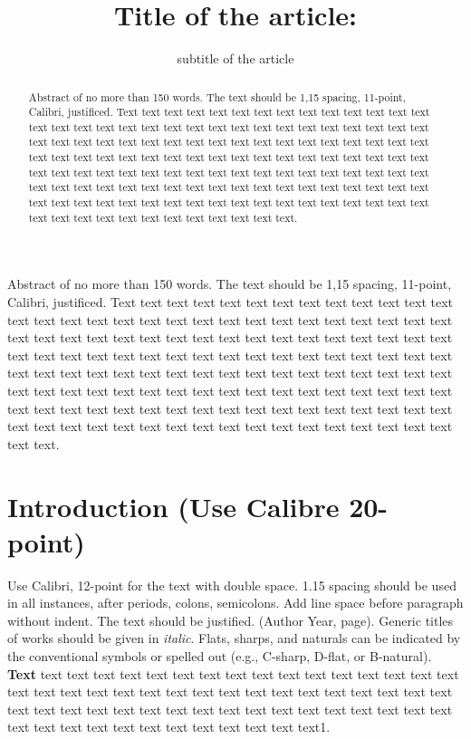 \documentclass{permusi}
\title{Title of the article:}
\subtitle{subtitle of the article}
\begin{document}
\begin{abstract}
 Abstract of no more than 150 words. The text should be 1,15 spacing, 11-point, Calibri, justificed. Text text
text text text text text text text text text text text text text text text text text text text text text text text text text text
text text text text text text text text text text text text text text text text text text text text text text text text text text
text text text text text text text text text text text text text text text text text text text text text text text text text text
text text text text text text text text text text text text text text text text text text text text text text text text text text
text text text text text text text text text text text text text text text text text text text text text text text text text text
text text.
\end{abstract}

\begin{resumo}
 Abstract of no more than 150 words. The text should be 1,15 spacing, 11-point, Calibri, justificed. Text text
text text text text text text text text text text text text text text text text text text text text text text text text text text
text text text text text text text text text text text text text text text text text text text text text text text text text text
text text text text text text text text text text text text text text text text text text text text text text text text text text
text text text text text text text text text text text text text text text text text text text text text text text text text text
text text text text text text text text text text text text text text text text text text text text text text text text text text
text text.
\end{resumo}


\maketitle

\section{Introduction (Use Calibre 20-point)}

Use Calibri, 12-point for the text with double space. 1.15 spacing should be used in all instances, after
periods, colons, semicolons. Add line space before paragraph without indent. The text should be justified.
(Author Year, page). Generic titles of works should be given in \textit{italic}. Flats, sharps, and naturals can be
indicated by the conventional symbols or spelled out (e.g., C-sharp, D-flat, or B-natural). \textbf{Text} text text text
text text text text text text text text text text text text text text text text text text text text text text text text
text text text text text text text text text text text text text text text text text text text text text text text text
text text text text text text text text text text text1. 
\end{document}
